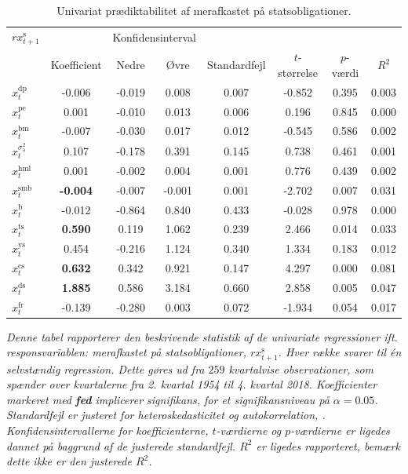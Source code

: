 \documentclass[
  a4paper,
  oneside]{memoir}
\begin{document}
\begin{table}[H]

\caption{\label{tab:UNI-s}Univariat prædiktabilitet af merafkastet på statsobligationer.}
\centering
\begin{threeparttable}
\begin{tabular}[t]{lccccccc}
\toprule
\multicolumn{1}{c}{$rx_{t+1}^{\text{s}}$} & \multicolumn{1}{c}{ } & \multicolumn{2}{c}{Konfidensinterval} & \multicolumn{4}{c}{ } \\
\cmidrule(l{3pt}r{3pt}){1-1} \cmidrule(l{3pt}r{3pt}){3-4}
  & Koefficient & Nedre & Øvre & Standardfejl & $t$-størrelse & $p$-værdi & $R^2$\\
\midrule
\rowcolor{gray!6}  $x_t^{\text{dp}}$ & -0.006 & -0.019 & 0.008 & 0.007 & -0.852 & 0.395 & 0.003\\
$x_t^{\text{pe}}$ & 0.001 & -0.010 & 0.013 & 0.006 & 0.196 & 0.845 & 0.000\\
\rowcolor{gray!6}  $x_t^{\text{bm}}$ & -0.007 & -0.030 & 0.017 & 0.012 & -0.545 & 0.586 & 0.002\\
$x_t^{\sigma_{\text{a}}^2}$ & 0.107 & -0.178 & 0.391 & 0.145 & 0.738 & 0.461 & 0.001\\
\rowcolor{gray!6}  $x_t^{\text{hml}}$ & 0.001 & -0.002 & 0.004 & 0.001 & 0.776 & 0.439 & 0.002\\
$x_t^{\text{smb}}$ & \textbf{-0.004} & -0.007 & -0.001 & 0.001 & -2.702 & 0.007 & 0.031\\
\rowcolor{gray!6}  $x_t^{\text{b}}$ & -0.012 & -0.864 & 0.840 & 0.433 & -0.028 & 0.978 & 0.000\\
$x_t^{\text{ts}}$ & \textbf{ 0.590} & 0.119 & 1.062 & 0.239 & 2.466 & 0.014 & 0.033\\
\rowcolor{gray!6}  $x_t^{\text{ys}}$ & 0.454 & -0.216 & 1.124 & 0.340 & 1.334 & 0.183 & 0.012\\
$x_t^{\text{cs}}$ & \textbf{ 0.632} & 0.342 & 0.921 & 0.147 & 4.297 & 0.000 & 0.081\\
\rowcolor{gray!6}  $x_t^{\text{ds}}$ & \textbf{ 1.885} & 0.586 & 3.184 & 0.660 & 2.858 & 0.005 & 0.047\\
$x_t^{\text{fr}}$ & -0.139 & -0.280 & 0.003 & 0.072 & -1.934 & 0.054 & 0.017\\
\bottomrule
\end{tabular}
\begin{tablenotes}
\item \textit{Denne tabel rapporterer den beskrivende statistik af de univariate regressioner ift. responsvariablen: merafkastet på statsobligationer, $rx_{t+1}^{\text{s}}$. Hver række svarer til én selvstændig regression. Dette gøres ud fra $259$ kvartalvise observationer, som spænder over kvartalerne fra 2. kvartal 1954 til 4. kvartal 2018. Koefficienter markeret med \textbf{fed} implicerer signifikans, for et signifikansniveau på $\alpha=0.05$. Standardfejl er justeret for heteroskedasticitet og autokorrelation, \citep{Newey1987}. Konfidensintervallerne for koefficienterne, $t$-værdierne og $p$-værdierne er ligedes dannet på baggrund af de justerede standardfejl. $R^2$ er ligedes rapporteret, bemærk dette ikke er den justerede $R^2$.}

\end{tablenotes}
\end{threeparttable}
\end{table}
\end{document}
